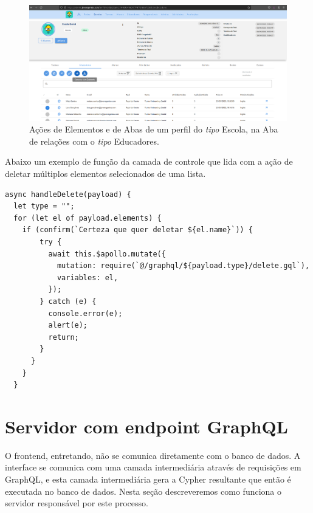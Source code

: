 \begin{figure}
    \centering
    \includegraphics[width=1\linewidth]{Imagens/chap04/front-other-actions.png}
    \caption{Ações de Elementos e de Abas de um perfil do \textit{tipo} Escola, na Aba de relações com o \textit{tipo} Educadores.}
    \label{fig:enter-label}
\end{figure}

Abaixo um exemplo de função da camada de controle que lida com a ação de deletar múltiplos elementos selecionados de uma lista.

\begin{lstlisting}
async handleDelete(payload) {
  let type = "";
  for (let el of payload.elements) {
    if (confirm(`Certeza que quer deletar ${el.name}`)) {
        try {
          await this.$apollo.mutate({
            mutation: require(`@/graphql/${payload.type}/delete.gql`),
            variables: el,
          });
        } catch (e) {
          console.error(e);
          alert(e);
          return;
        }
      }
    }
  }
\end{lstlisting}

\section{Servidor com endpoint GraphQL}

O frontend, entretando, não se comunica diretamente com o banco de dados. A interface se comunica com uma camada intermediária através de requisições em GraphQL, e esta camada intermediária gera a Cypher resultante que então é executada no banco de dados. Nesta seção descreveremos como funciona o servidor responsável por este processo.

